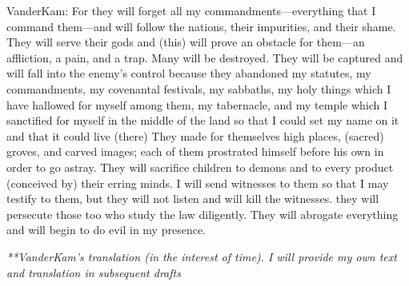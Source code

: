 \begin{ethiopictext}
\end{ethiopictext}
\begin{transliteration}
\end{transliteration}
\begin{translation}
    VanderKam: For they will forget all my commandments---everything that I command them---and will follow the nations, their impurities, and their shame. They will serve their gods and (this) will prove an obstacle for them---an affliction, a pain, and a trap.
    Many will be destroyed. They will be captured and will fall into the enemy's control because they abandoned my statutes, my commandments, my covenantal festivals, my sabbaths, my holy things which I have hallowed for myself among them, my tabernacle, and my temple which I sanctified for myself in the middle of the land so that I could set my name on it and that it could live (there)
    They  made for themselves high places, (sacred) groves, and carved images; each of them prostrated himself before his own in  order to go astray. They will sacrifice children to demons and to every product (conceived by) their erring minds.
    I will send witnesses to them so that I may testify to them, but they will not listen and will kill the witnesses. they will persecute those too who study the law diligently. They will abrogate everything and will begin to do evil in my presence.

    \emph{**VanderKam's translation (in the interest of time). I will provide my own text and translation in subsequent drafts}
\end{translation}